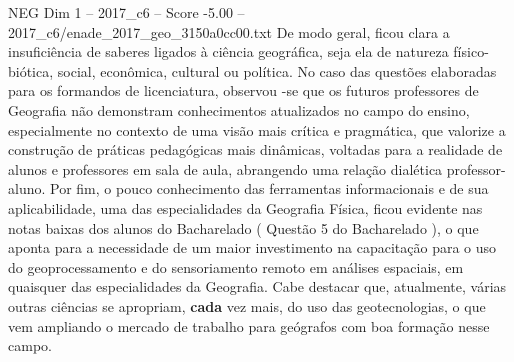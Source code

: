 \begin{textsample}{NEG Dim 1 – 2017\_c6 – Score -5.00 – 2017\_c6/enade\_2017\_geo\_3150a0cc00.txt}
De modo geral, ficou clara a insuficiência de saberes ligados à ciência geográfica, seja ela de natureza físico-biótica, social, econômica, cultural ou política.
No caso das questões elaboradas para os formandos de licenciatura, observou -se que os futuros professores de Geografia não demonstram conhecimentos atualizados no campo do ensino, especialmente no contexto de uma visão mais crítica e pragmática, que valorize a construção de práticas pedagógicas mais dinâmicas, voltadas para a realidade de alunos e professores em sala de aula, abrangendo uma relação dialética professor-aluno.
Por fim, o pouco conhecimento das ferramentas informacionais e de sua aplicabilidade, uma das especialidades da Geografia Física, ficou evidente nas notas baixas dos alunos do Bacharelado ( Questão 5 do Bacharelado ), o que aponta para a necessidade de um maior investimento na capacitação para o uso do geoprocessamento e do sensoriamento remoto em análises espaciais, em quaisquer das especialidades da Geografia.
Cabe destacar que, atualmente, várias outras ciências se apropriam, \textbf{cada} vez mais, do uso das geotecnologias, o que vem ampliando o mercado de trabalho para geógrafos com boa formação nesse campo.

\end{textsample}
